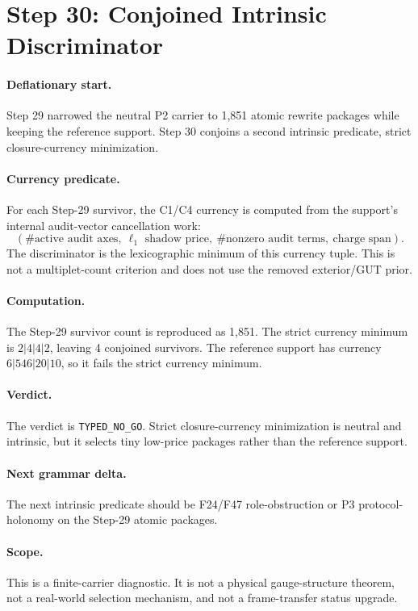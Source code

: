 \section{Step 30: Conjoined Intrinsic Discriminator}

\paragraph{Deflationary start.}
Step 29 narrowed the neutral P2 carrier to 1,851 atomic rewrite packages while keeping the reference support. Step 30 conjoins a second intrinsic predicate, strict closure-currency minimization.

\paragraph{Currency predicate.}
For each Step-29 survivor, the C1/C4 currency is computed from the support's internal audit-vector cancellation work:
\[
(\#\text{active audit axes},\ \ell_1\text{ shadow price},\ \#\text{nonzero audit terms},\ \text{charge span}).
\]
The discriminator is the lexicographic minimum of this currency tuple. This is not a multiplet-count criterion and does not use the removed exterior/GUT prior.

\paragraph{Computation.}
The Step-29 survivor count is reproduced as 1,851. The strict currency minimum is \(2|4|4|2\), leaving 4 conjoined survivors. The reference support has currency \(6|546|20|10\), so it fails the strict currency minimum.

\paragraph{Verdict.}
The verdict is \texttt{TYPED\_NO\_GO}. Strict closure-currency minimization is neutral and intrinsic, but it selects tiny low-price packages rather than the reference support.

\paragraph{Next grammar delta.}
The next intrinsic predicate should be F24/F47 role-obstruction or P3 protocol-holonomy on the Step-29 atomic packages.

\paragraph{Scope.}
This is a finite-carrier diagnostic. It is not a physical gauge-structure theorem, not a real-world selection mechanism, and not a frame-transfer status upgrade.
